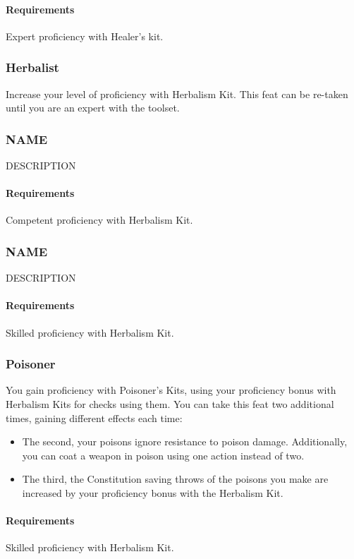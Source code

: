     \paragraph{Requirements} Expert proficiency with Healer's kit.
\subsubsection{Herbalist} \label{feat::herbalist}
    Increase your level of proficiency with Herbalism Kit.
    This feat can be re-taken until you are an expert with the toolset.
\subsubsection{NAME} \label{feat::name}
    DESCRIPTION
    \paragraph{Requirements} Competent proficiency with Herbalism Kit.
\subsubsection{NAME} \label{feat::name}
    DESCRIPTION %
    \paragraph{Requirements} Skilled proficiency with Herbalism Kit.
\subsubsection{Poisoner} \label{feat::poisoner}
    You gain proficiency with Poisoner's Kits, using your proficiency bonus with Herbalism Kits for checks using them.
    You can take this feat two additional times, gaining different effects each time:
    \begin{itemize}
        \item The second, your poisons ignore resistance to poison damage.
        Additionally, you can coat a weapon in poison using one action instead of two.
        \item The third, the Constitution saving throws of the poisons you make are increased by your proficiency bonus with the Herbalism Kit.
    \end{itemize}
    \paragraph{Requirements} Skilled proficiency with Herbalism Kit.
